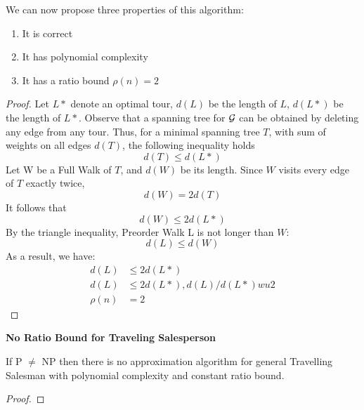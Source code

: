 We can now propose three properties of this algorithm:
\begin{enumerate}
    \item It is correct
    \item It has polynomial complexity
    \item It has a ratio bound $\rho(n) = 2$
\end{enumerate}

\begin{proof}
    Let $L*$ denote an optimal tour,
    $d(L)$ be the length of $L$,
    $d(L*)$ be the length of $L*$.
    Observe that a spanning tree for $\mathcal{G}$ can be obtained by deleting any edge from any tour.
    Thus, for a minimal spanning tree $T$,
    with sum of weights on all edges $d(T)$,
    the following inequality holds
    $$d(T) \leq d(L*)$$
    Let W be a Full Walk of $T$,
    and $d(W)$ be its length.
    Since $W$ visits every edge of $T$ exactly twice,
    $$d(W ) = 2d(T )$$
    It follows that
    $$d(W) \leq 2d(L*)$$
    By the triangle inequality,
    Preorder Walk L is not longer than $W$:
    $$d(L) \leq d(W)$$
    As a result, we have:
    \begin{align*}
        d(L) &\leq 2d(L*)\\
        d(L) &\leq 2d(L*), d(L)/d(L*) wu 2 \\
        \rho(n) &= 2
    \end{align*}
\end{proof}

\textbf{No Ratio Bound for Traveling Salesperson}\\
\begin{theorem}
    If P $\neq$ NP then there is no
    approximation algorithm for general Travelling Salesman with polynomial complexity
    and constant ratio bound.
\end{theorem}

\begin{proof}
\end{proof}

